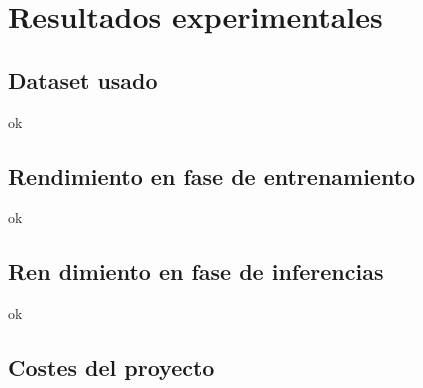 \mbox{}

\chapter{Resultados experimentales}
\label{ch:chapte5}

\section{Dataset usado}

ok
\section{Rendimiento en fase de entrenamiento}
ok
\section{Ren dimiento en fase de inferencias}
ok
\section{Costes del proyecto}